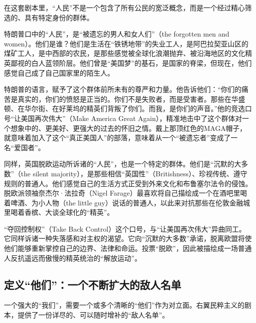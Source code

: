 在这套剧本里，“人民”不是一个包含了所有公民的宽泛概念，而是一个经过精心筛选的、具有特定身份的群体。

特朗普口中的“人民”，是“被遗忘的男人和女人们”（the forgotten men and women）。他们是谁？他们是生活在“铁锈地带”的失业工人，是阿巴拉契亚山区的煤矿工人，是中西部的农民，是那些感觉被全球化浪潮抛弃、被沿海地区的文化精英鄙视的白人蓝领阶层。他们曾是“美国梦”的基石，是国家的脊梁，但现在，他们感觉自己成了自己国家里的陌生人。

特朗普的语言，赋予了这个群体前所未有的尊严和力量。他告诉他们：“你们的痛苦是真实的，你们的愤怒是正当的。你们不是失败者，而是受害者。那些在华盛顿、在华尔街、在好莱坞的精英们背叛了你们。而我，是你们的声音。”他的竞选口号“让美国再次伟大”（Make America Great Again），精准地击中了这个群体对一个想象中的、更美好、更强大的过去的怀旧之情。戴上那顶红色的MAGA帽子，就意味着加入了这个“真正美国人”的部落，意味着从一个“被遗忘者”变成了一名“爱国者”。

同样，英国脱欧运动所诉诸的“人民”，也是一个特定的群体。他们是“沉默的大多数”（the silent majority），是那些相信“英国性”（Britishness）、珍视传统、遵守规则的普通人。他们感觉自己的生活方式正受到外来文化和布鲁塞尔法令的侵蚀。脱欧派领袖奈杰尔·法拉奇（Nigel Farage）最喜欢将自己描绘成一个在酒吧里喝着啤酒、为小人物（the little guy）说话的普通人，以此来对抗那些在伦敦金融城里喝着香槟、大谈全球化的“精英”。

“夺回控制权”（Take Back Control）这个口号，与“让美国再次伟大”异曲同工。它同样诉诸一种失落感和对主权的渴望。它向“沉默的大多数”承诺，脱离欧盟将使他们能够重新掌控自己的边界、法律和命运。投票“脱欧”，因此被描绘成一场普通人反抗遥远而傲慢的精英统治的“解放运动”。

\subsection{定义“他们”：一个不断扩大的敌人名单}

一个强大的“我们”，需要一个或多个清晰的“他们”作为对立面。右翼民粹主义的剧本，提供了一份详尽的、可以随时增补的“敌人名单”。

